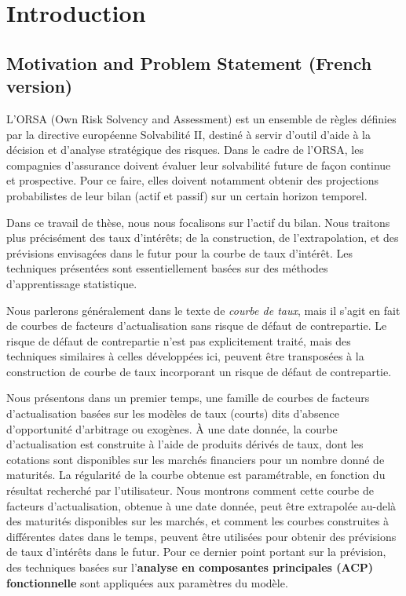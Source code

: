 %

\chapter{Introduction}
\label{sec:intro}

\section{Motivation and Problem Statement (French version)}

L'ORSA (Own Risk Solvency and Assessment) est un ensemble de règles définies par la directive européenne Solvabilit\'e II, destiné à servir d'outil d'aide à la décision et d'analyse stratégique des risques. Dans le cadre de l'ORSA, les compagnies d'assurance doivent évaluer leur solvabilité future de façon continue et prospective. Pour ce faire, elles doivent notamment obtenir des projections probabilistes de leur bilan (actif et passif) sur un certain horizon temporel.   

Dans ce travail de thèse, nous nous focalisons sur l'actif du bilan. Nous traitons plus précisément des taux d'intérêts; de la construction, de l'extrapolation, et des prévisions envisagées dans le futur pour la courbe de taux d'intérêt. Les techniques présentées sont essentiellement basées sur des méthodes d'apprentissage statistique.    

Nous parlerons généralement dans le texte de \textit{courbe de taux}, mais il s'agit en fait  de courbes de facteurs d'actualisation sans risque de défaut de contrepartie. Le risque de défaut de contrepartie n'est pas explicitement traité, mais des techniques similaires à celles développées ici, peuvent être transposées à la construction de courbe de taux incorporant un risque de défaut de contrepartie.

Nous présentons dans un premier temps, une famille de courbes de facteurs d'actualisation basées sur les modèles de taux (courts) dits d'absence d'opportunité d'arbitrage ou exogènes. À une date donnée, la courbe d'actualisation est construite à l'aide de produits dérivés de taux, dont les cotations sont disponibles sur les marchés financiers pour un nombre donné de maturités. La régularité de la courbe obtenue est  paramétrable, en fonction du résultat recherché par l'utilisateur. Nous montrons comment cette courbe de facteurs d'actualisation, obtenue à une date donnée, peut être extrapolée au-delà des maturités disponibles sur les marchés, et comment les courbes construites à différentes dates dans le temps, peuvent être utilisées pour obtenir des prévisions de taux d'intérêts dans le futur.  Pour ce dernier point portant sur la prévision, des techniques basées sur l'\textbf{analyse en composantes principales (ACP) fonctionnelle} sont appliquées aux paramètres du modèle. 

